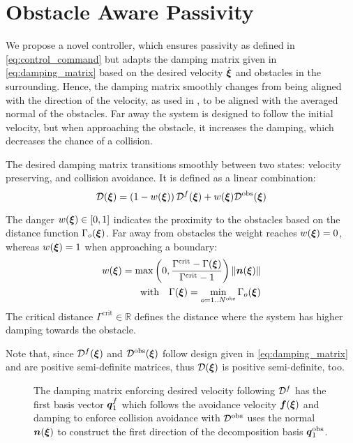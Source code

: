 \section{Obstacle Aware Passivity} \label{sec:obstacle_aware_passivity}
We propose a novel controller, which ensures passivity as defined in \eqref{eq:control_command} but adapts the damping matrix given in \eqref{eq:damping_matrix} based on the desired velocity $\dot{\boldsymbol{\xi}}$ and obstacles in the surrounding. 
Hence, the damping matrix smoothly changes from being aligned with the direction of the velocity, as used in \cite{kronander2015passive}, to be aligned with the averaged normal of the obstacles.
Far away the system is designed to follow the initial velocity, but when approaching the obstacle, it increases the damping, which decreases the chance of a collision.

The desired damping matrix transitions smoothly between two states: velocity preserving, and collision avoidance. It is defined as a linear combination:
\begin{equation}
    \matd D(\vecs\xi) = \left(1 - w(\vecs\xi) \right) {\matd D^{f}}(\vecs\xi) + w(\vecs\xi)  {\matd D^{\mathrm{obs}}}(\vecs\xi) \label{eq:damping_summation}
\end{equation}

The danger $w(\boldsymbol{\xi}) \in [0, 1]$ indicates the proximity to the obstacles based on the distance function $\Gamma_o(\boldsymbol{\xi})$. Far away from obstacles the weight reaches $w(\boldsymbol{\xi}) = 0$, whereas $w(\boldsymbol{\xi}) = 1$ when approaching a boundary:
\begin{equation}
  \begin{split}
w(\vecs\xi) =
\max \left(0,  \frac{\Gamma^{\mathrm{crit}} - \Gamma(\vecs\xi)}{\Gamma^{\mathrm{crit}} - 1} \right) \| \vecs n(\vecs \xi) \| \\
\text{with} \quad
\Gamma(\vecs\xi) = \min_{o = 1..N^{\mathrm{obs}}} \Gamma_o(\vecs\xi)
\label{eq:weight_function}
\end{split}
\end{equation}
The critical distance $\Gamma^{\mathrm{crit}} \in \mathbb{R}$ defines the distance where the system has higher damping towards the obstacle.

Note that, since ${\mathcal{D}^f}(\boldsymbol{\xi})$ and $\mathcal{D^{\mathrm{obs}}}(\boldsymbol{\xi})$ follow design given in \eqref{eq:damping_matrix} and are positive semi-definite matrices, thus $\mathcal{D}(\boldsymbol{\xi})$ is positive semi-definite, too.

\begin{figure}
  \center
  
\caption{The damping matrix enforcing desired velocity following $\mathcal{D}^{f}$ has the first basis vector $\boldsymbol{q}_1^{f}$ which follows the avoidance velocity $\boldsymbol{f}(\boldsymbol{\xi})$ and damping to enforce collision avoidance with $\mathcal{D}^{\mathrm{obs}}$ uses the normal $\boldsymbol{n}(\boldsymbol{\xi})$ to construct the first direction of the decomposition basis $\boldsymbol{q}^{\mathrm{obs}}_1$.}
\label{fig:damping_basis_construction}
\end{figure}

